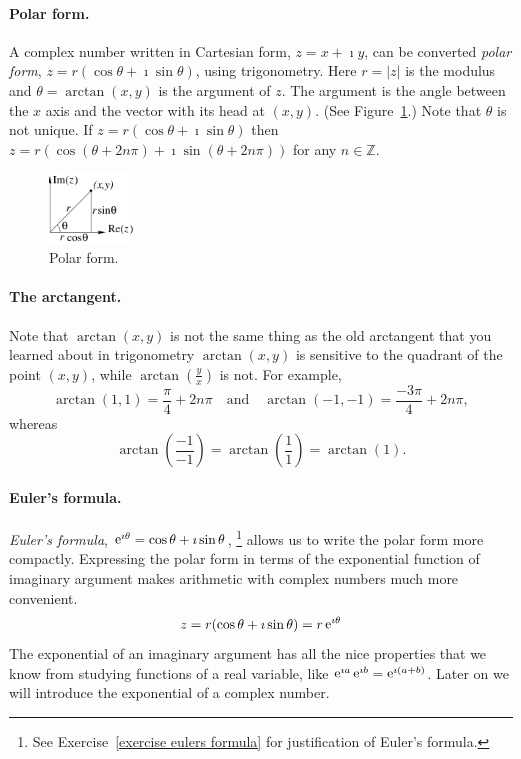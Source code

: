 \paragraph{Polar form.}
A complex number written in Cartesian form, $z = x + \imath y$,
can be converted \textit{polar form},
$z = r (\cos \theta + \imath \sin \theta)$, using trigonometry.
Here $r = |z|$ is the modulus and $\theta = \arctan(x,y)$ is 
the argument of $z$.  The argument is the angle between the $x$ axis and
the vector with its head at $(x,y)$.  (See Figure~\ref{polarfrm}.)
Note that $\theta$ is not unique.  If $z = r (\cos \theta + \imath \sin \theta)$ 
then $z = r (\cos (\theta + 2 n \pi) + \imath \sin (\theta + 2 n \pi) )$ for any
$n \in \mathbb{Z}$.

\begin{figure}[h!]
  \begin{center}
    \includegraphics[width=0.2\textwidth]{fcv/number/polarfrm}
  \end{center}
  \caption{Polar form.}
  \label{polarfrm}
\end{figure}




\paragraph{The arctangent.}
Note that $\arctan(x,y)$ is not the same thing as the old arctangent that
you learned about in trigonometry
$\arctan(x,y)$ is sensitive to the quadrant of the point $(x,y)$, while
$\arctan\left(\frac{y}{x} \right)$ is not.
For example,
\[
\arctan(1,1) = \frac{\pi}{4} + 2 n \pi \quad \mathrm{and} \quad
\arctan(-1,-1) = \frac{-3 \pi}{4} + 2 n \pi,
\]
whereas
\[
\arctan \left( \frac{-1}{-1} \right) = \arctan \left(\frac{1}{1} \right)
= \arctan(1).
\]




\paragraph{Euler's formula.}
\textit{Euler's formula}, $\mathop{\mathrm{e}}\nolimits^{\imath \theta} = \cos \theta + \imath \sin \theta$,%
\footnote{
  See Exercise~\ref{exercise eulers formula} for justification of 
  Euler's formula.
  }
allows us to write the polar form more compactly.  Expressing 
the polar form in terms of the exponential function of imaginary argument
makes arithmetic with complex numbers much more convenient.
\[
z = r (\cos \theta + \imath \sin \theta) = r \mathop{\mathrm{e}}\nolimits^{\imath \theta}
\]
The exponential of an imaginary argument has all the nice properties that
we know from studying functions of a real variable, like
$\mathop{\mathrm{e}}\nolimits^{\imath a} \mathop{\mathrm{e}}\nolimits^{\imath b} = \mathop{\mathrm{e}}\nolimits^{\imath(a + b)}$.  Later on we will 
introduce the exponential of a complex number.

